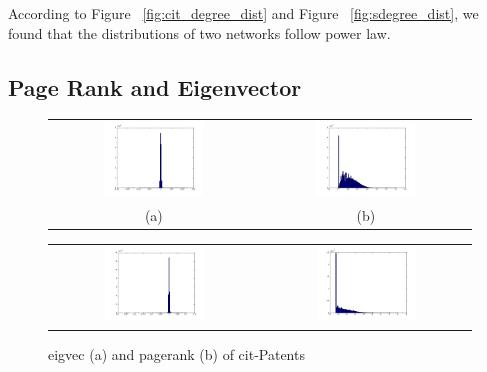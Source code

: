 According to Figure ~\ref{fig:cit_degree_dist} and Figure ~\ref{fig:sdegree_dist}, we found that the distributions of two networks follow power law. 

\subsection{Page Rank and Eigenvector}

\begin{figure}[htbf]
\begin{center}
\begin{tabular}{cc}
     \includegraphics[width=0.5\textwidth]{FIG/cit_result/eigvec.png} &
     \includegraphics[width=0.5\textwidth]{FIG/cit_result/pagerank.png} \\
    (a) & (b) 
\end{tabular}
\caption{ eigvec (a) and pagerank (b) of cit-Patents}
\label{fig:cit_eigen}
\begin{tabular}{cc}
     \includegraphics[width=0.5\textwidth]{FIG/soc_result/eigvec.png} &
     \includegraphics[width=0.5\textwidth]{FIG/soc_result/pagerank.png} \\

\end{tabular}
\end{center}
\end{figure}
